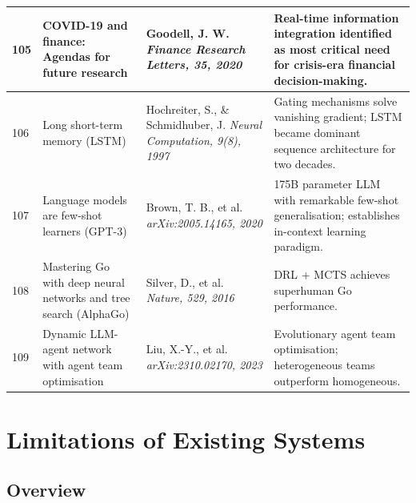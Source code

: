 \documentclass[12pt,a4paper,oneside]{report}
\theoremstyle{definition}
\theoremstyle{remark}
\begin{document}
\begin{center}
\begin{longtable}{|p{0.8cm}|p{4.2cm}|>{\raggedright\arraybackslash}p{4cm}|p{4.5cm}|}
105 & COVID-19 and finance: Agendas for future research \cite{Goodell2020COVIDFinance} & Goodell, J. W. \newline\newline \textit{Finance Research Letters, 35, 2020} & Real-time information integration identified as most critical need for crisis-era financial decision-making. \\ \hline

106 & Long short-term memory (LSTM) \cite{Hochreiter1997LSTM} & Hochreiter, S., \& Schmidhuber, J. \newline\newline \textit{Neural Computation, 9(8), 1997} & Gating mechanisms solve vanishing gradient; LSTM became dominant sequence architecture for two decades. \\ \hline

107 & Language models are few-shot learners (GPT-3) \cite{Brown2020GPT3} & Brown, T. B., et al. \newline\newline \textit{arXiv:2005.14165, 2020} & 175B parameter LLM with remarkable few-shot generalisation; establishes in-context learning paradigm. \\ \hline

108 & Mastering Go with deep neural networks and tree search (AlphaGo) \cite{Silver2016AlphaGo} & Silver, D., et al. \newline\newline \textit{Nature, 529, 2016} & DRL + MCTS achieves superhuman Go performance. \\ \hline

109 & Dynamic LLM-agent network with agent team optimisation \cite{Liu2023LLMAgents} & Liu, X.-Y., et al. \newline\newline \textit{arXiv:2310.02170, 2023} & Evolutionary agent team optimisation; heterogeneous teams outperform homogeneous. \\ \hline
\end{longtable}
\end{center}

\chapter{Limitations of Existing Systems}

\section{Overview}
\end{document}
